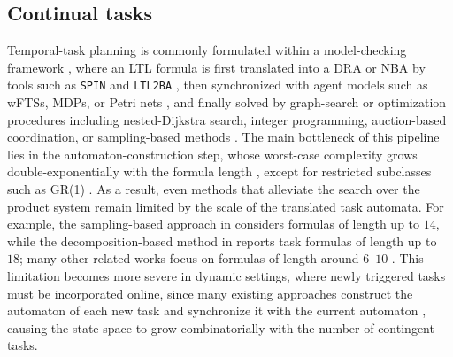 \subsection{Continual tasks}
\label{ch01:related-work}

Temporal-task planning is commonly formulated within a model-checking framework
\cite{baier2008principles}, where an LTL formula is first translated into a
DRA or NBA by tools such as \texttt{SPIN} and \texttt{LTL2BA}
\cite{ben2010primer,gastin2002fast}, then synchronized with agent
models such as wFTSs, MDPs, or Petri nets
\cite{baier2008principles,ding2014optimal,kloetzer2015accomplish}, and finally
solved by graph-search or optimization procedures including nested-Dijkstra
search, integer programming, auction-based coordination, or sampling-based
methods \cite{schillinger2018simultaneous,leahy2021scalable,
schillinger2019hierarchical,kantaros2020stylus}. The main bottleneck of this
pipeline lies in the automaton-construction step, whose worst-case complexity
grows double-exponentially with the formula length \cite{gastin2002fast},
except for restricted subclasses such as GR(1)
\cite{piterman2006synthesis}. As a result, even methods that alleviate the
search over the product system remain limited by the scale of the translated
task automata. For example, the sampling-based approach in
\cite{kantaros2020stylus} considers formulas of length up to $14$, while the
decomposition-based method in \cite{schillinger2018simultaneous} reports task
formulas of length up to $18$; many other related works focus on formulas of
length around $6$--$10$ \cite{vasilopoulos2021reactive,
verginis2018multiagent,lacerda2014optimal,feyzabadi2016multiobjective}. This
limitation becomes more severe in dynamic settings, where newly triggered tasks
must be incorporated online, since many existing approaches construct the
automaton of each new task and synchronize it with the current automaton
\cite{lacerda2014optimal,feyzabadi2016multiobjective}, causing the state space
to grow combinatorially with the number of contingent tasks.



